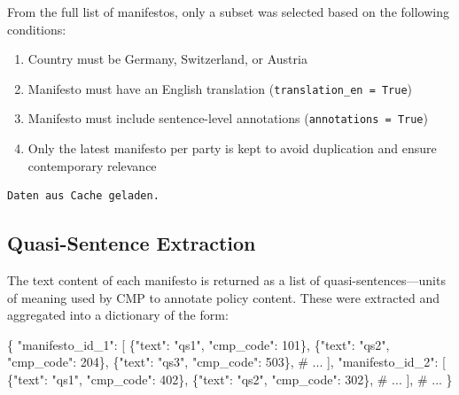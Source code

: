 \documentclass[
  letterpaper,
  DIV=11,
  numbers=noendperiod]{scrartcl}
\newenvironment{Shaded}{\begin{snugshade}}{\end{snugshade}}
\newcommand{\CommentTok}[1]{\textcolor[rgb]{0.37,0.37,0.37}{#1}}
\newcommand{\DecValTok}[1]{\textcolor[rgb]{0.68,0.00,0.00}{#1}}
\newcommand{\NormalTok}[1]{\textcolor[rgb]{0.00,0.23,0.31}{#1}}
\newcommand{\StringTok}[1]{\textcolor[rgb]{0.13,0.47,0.30}{#1}}
\providecommand{\tightlist}{%
  \setlength{\itemsep}{0pt}\setlength{\parskip}{0pt}}
\begin{document}
From the full list of manifestos, only a subset was selected based on
the following conditions:

\begin{enumerate}
\def\labelenumi{\arabic{enumi}.}
\tightlist
\item
  Country must be Germany, Switzerland, or Austria
\item
  Manifesto must have an English translation
  (\texttt{translation\_en\ =\ True})
\item
  Manifesto must include sentence-level annotations
  (\texttt{annotations\ =\ True})
\item
  Only the latest manifesto per party is kept to avoid duplication and
  ensure contemporary relevance
\end{enumerate}

\begin{verbatim}
Daten aus Cache geladen.
\end{verbatim}

\subsection{Quasi-Sentence Extraction}\label{quasi-sentence-extraction}

The text content of each manifesto is returned as a list of
quasi-sentences---units of meaning used by CMP to annotate policy
content. These were extracted and aggregated into a dictionary of the
form:

\begin{Shaded}
\begin{Highlighting}[]
\NormalTok{\{}
    \StringTok{"manifesto\_id\_1"}\NormalTok{: [}
\NormalTok{        \{}\StringTok{"text"}\NormalTok{: }\StringTok{"qs1"}\NormalTok{, }\StringTok{"cmp\_code"}\NormalTok{: }\DecValTok{101}\NormalTok{\},}
\NormalTok{        \{}\StringTok{"text"}\NormalTok{: }\StringTok{"qs2"}\NormalTok{, }\StringTok{"cmp\_code"}\NormalTok{: }\DecValTok{204}\NormalTok{\},}
\NormalTok{        \{}\StringTok{"text"}\NormalTok{: }\StringTok{"qs3"}\NormalTok{, }\StringTok{"cmp\_code"}\NormalTok{: }\DecValTok{503}\NormalTok{\},}
        \CommentTok{\# ...}
\NormalTok{    ],}
    \StringTok{"manifesto\_id\_2"}\NormalTok{: [}
\NormalTok{        \{}\StringTok{"text"}\NormalTok{: }\StringTok{"qs1"}\NormalTok{, }\StringTok{"cmp\_code"}\NormalTok{: }\DecValTok{402}\NormalTok{\},}
\NormalTok{        \{}\StringTok{"text"}\NormalTok{: }\StringTok{"qs2"}\NormalTok{, }\StringTok{"cmp\_code"}\NormalTok{: }\DecValTok{302}\NormalTok{\},}
        \CommentTok{\# ...}
\NormalTok{    ],}
    \CommentTok{\# ...}
\NormalTok{\}}
\end{Highlighting}
\end{Shaded}
\end{document}
